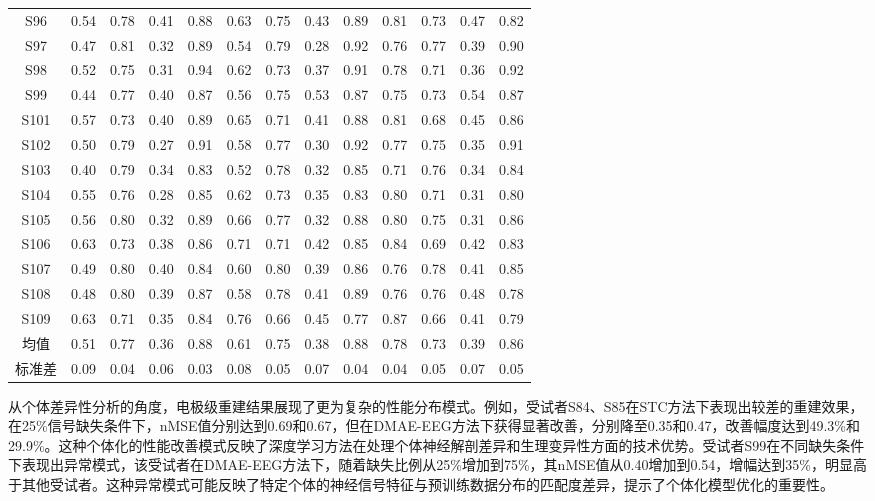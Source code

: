 \begin{table}[htbp]
{\begin{tabular}{ccccccccccccc}
S96 & 0.54 & 0.78 & 0.41 & 0.88 & 0.63 & 0.75 & 0.43 & 0.89 & 0.81 & 0.73 & 0.47 & 0.82 \\
S97 & 0.47 & 0.81 & 0.32 & 0.89 & 0.54 & 0.79 & 0.28 & 0.92 & 0.76 & 0.77 & 0.39 & 0.90 \\
S98 & 0.52 & 0.75 & 0.31 & 0.94 & 0.62 & 0.73 & 0.37 & 0.91 & 0.78 & 0.71 & 0.36 & 0.92 \\
S99 & 0.44 & 0.77 & 0.40 & 0.87 & 0.56 & 0.75 & 0.53 & 0.87 & 0.75 & 0.73 & 0.54 & 0.87 \\
S101 & 0.57 & 0.73 & 0.40 & 0.89 & 0.65 & 0.71 & 0.41 & 0.88 & 0.81 & 0.68 & 0.45 & 0.86 \\
S102 & 0.50 & 0.79 & 0.27 & 0.91 & 0.58 & 0.77 & 0.30 & 0.92 & 0.77 & 0.75 & 0.35 & 0.91 \\
S103 & 0.40 & 0.79 & 0.34 & 0.83 & 0.52 & 0.78 & 0.32 & 0.85 & 0.71 & 0.76 & 0.34 & 0.84 \\
S104 & 0.55 & 0.76 & 0.28 & 0.85 & 0.62 & 0.73 & 0.35 & 0.83 & 0.80 & 0.71 & 0.31 & 0.80 \\
S105 & 0.56 & 0.80 & 0.32 & 0.89 & 0.66 & 0.77 & 0.32 & 0.88 & 0.80 & 0.75 & 0.31 & 0.86 \\
S106 & 0.63 & 0.73 & 0.38 & 0.86 & 0.71 & 0.71 & 0.42 & 0.85 & 0.84 & 0.69 & 0.42 & 0.83 \\
S107 & 0.49 & 0.80 & 0.40 & 0.84 & 0.60 & 0.80 & 0.39 & 0.86 & 0.76 & 0.78 & 0.41 & 0.85 \\
S108 & 0.48 & 0.80 & 0.39 & 0.87 & 0.58 & 0.78 & 0.41 & 0.89 & 0.76 & 0.76 & 0.48 & 0.78 \\
S109 & 0.63 & 0.71 & 0.35 & 0.84 & 0.76 & 0.66 & 0.45 & 0.77 & 0.87 & 0.66 & 0.41 & 0.79 \\
\midrule
均值 & 0.51 & 0.77 & 0.36 & 0.88 & 0.61 & 0.75 & 0.38 & 0.88 & 0.78 & 0.73 & 0.39 & 0.86 \\
标准差 & 0.09 & 0.04 & 0.06 & 0.03 & 0.08 & 0.05 & 0.07 & 0.04 & 0.04 & 0.05 & 0.07 & 0.05 \\
\bottomrule
\end{tabular}%
}
\end{table}

从个体差异性分析的角度，电极级重建结果展现了更为复杂的性能分布模式。例如，受试者S84、S85在STC方法下表现出较差的重建效果，在25\%信号缺失条件下，nMSE值分别达到0.69和0.67，但在DMAE-EEG方法下获得显著改善，分别降至0.35和0.47，改善幅度达到49.3\%和29.9\%。这种个体化的性能改善模式反映了深度学习方法在处理个体神经解剖差异和生理变异性方面的技术优势。受试者S99在不同缺失条件下表现出异常模式，该受试者在DMAE-EEG方法下，随着缺失比例从25\%增加到75\%，其nMSE值从0.40增加到0.54，增幅达到35\%，明显高于其他受试者。这种异常模式可能反映了特定个体的神经信号特征与预训练数据分布的匹配度差异，提示了个体化模型优化的重要性。

